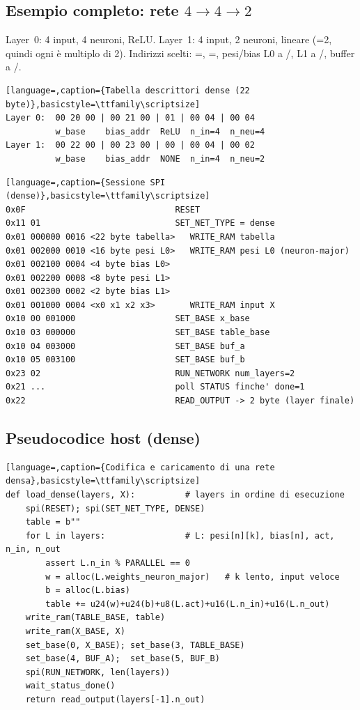 \subsection{Esempio completo: rete $4\to4\to2$}
Layer~0: 4 input, 4 neuroni, ReLU. Layer~1: 4 input, 2 neuroni, lineare
(=2, quindi ogni  è multiplo di 2). Indirizzi scelti:
=, =, pesi/bias L0 a
/, L1 a /, buffer a
/.

\begin{lstlisting}[language=,caption={Tabella descrittori dense (22 byte)},basicstyle=\ttfamily\scriptsize]
Layer 0:  00 20 00 | 00 21 00 | 01 | 00 04 | 00 04
          w_base    bias_addr  ReLU  n_in=4  n_neu=4
Layer 1:  00 22 00 | 00 23 00 | 00 | 00 04 | 00 02
          w_base    bias_addr  NONE  n_in=4  n_neu=2
\end{lstlisting}

\begin{lstlisting}[language=,caption={Sessione SPI (dense)},basicstyle=\ttfamily\scriptsize]
0x0F                              RESET
0x11 01                           SET_NET_TYPE = dense
0x01 000000 0016 <22 byte tabella>   WRITE_RAM tabella
0x01 002000 0010 <16 byte pesi L0>   WRITE_RAM pesi L0 (neuron-major)
0x01 002100 0004 <4 byte bias L0>
0x01 002200 0008 <8 byte pesi L1>
0x01 002300 0002 <2 byte bias L1>
0x01 001000 0004 <x0 x1 x2 x3>       WRITE_RAM input X
0x10 00 001000                    SET_BASE x_base
0x10 03 000000                    SET_BASE table_base
0x10 04 003000                    SET_BASE buf_a
0x10 05 003100                    SET_BASE buf_b
0x23 02                           RUN_NETWORK num_layers=2
0x21 ...                          poll STATUS finche' done=1
0x22                              READ_OUTPUT -> 2 byte (layer finale)
\end{lstlisting}

\subsection{Pseudocodice host (dense)}
\begin{lstlisting}[language=,caption={Codifica e caricamento di una rete densa},basicstyle=\ttfamily\scriptsize]
def load_dense(layers, X):          # layers in ordine di esecuzione
    spi(RESET); spi(SET_NET_TYPE, DENSE)
    table = b""
    for L in layers:                # L: pesi[n][k], bias[n], act, n_in, n_out
        assert L.n_in % PARALLEL == 0
        w = alloc(L.weights_neuron_major)   # k lento, input veloce
        b = alloc(L.bias)
        table += u24(w)+u24(b)+u8(L.act)+u16(L.n_in)+u16(L.n_out)
    write_ram(TABLE_BASE, table)
    write_ram(X_BASE, X)
    set_base(0, X_BASE); set_base(3, TABLE_BASE)
    set_base(4, BUF_A);  set_base(5, BUF_B)
    spi(RUN_NETWORK, len(layers))
    wait_status_done()
    return read_output(layers[-1].n_out)
\end{lstlisting}

